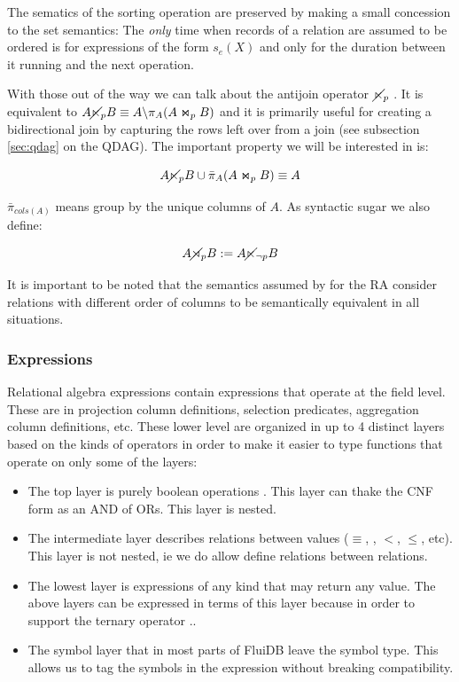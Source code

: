 The sematics of the sorting operation are preserved by making a small
concession to the set semantics: The \emph{only} time when records of a
relation are assumed to be ordered is for expressions of the form
\(s_e(X)\) and only for the duration between it running and the next
operation.

With those out of the way we can talk about the antijoin operator
\(\cancel\ltimes_p\) . It is equivalent to
\(A \cancel\ltimes_p B \equiv A \backslash \pi_A(A \Join_p B)\) and it is
primarily useful for creating a bidirectional join by capturing the
rows left over from a join (see subsection \ref{sec:qdag} on the
QDAG). The important property we will be interested in is:

\[
  A \cancel\ltimes_p B \cup \bar\pi_A(A \Join_p B) \equiv A
\]

\(\bar{\pi}_{cols(A)}\) means group by the unique columns of \(A\).  As
syntactic sugar we also define:

\[
  A \cancel\rtimes_p B := A \cancel\ltimes_{\neg p} B
\]

It is important to be noted that the semantics assumed by for the RA
consider relations with different order of columns to be semantically
equivalent in all situations.

\subsubsection{Expressions}

Relational algebra expressions contain expressions that operate at the
field level. These are in projection column definitions, selection
predicates, aggregation column definitions, etc. These lower level are
organized in up to 4 distinct layers based on the kinds of operators
in order to make it easier to type functions that operate on only some
of the layers:

\begin{itemize}
\item The top layer is purely boolean operations . This
  layer can thake the CNF form as an AND of ORs. This layer is nested.
\item The intermediate layer  describes relations between values
  (\(\equiv\), , \(<\), \(\le\), etc). This layer is not
  nested, ie we do allow define relations between relations.
\item The lowest layer  is expressions of any kind that may
  return any value. The above layers can be expressed in terms of this
  layer because in order to support the ternary operator ..
\item The symbol layer that in most parts of FluiDB leave the symbol
  type. This allows us to tag the symbols in the expression without
  breaking compatibility.
\end{itemize}

